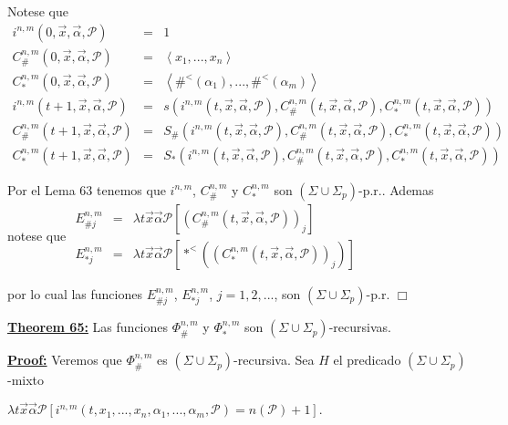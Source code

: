 Notese que
\(\displaystyle \begin{array}{rcl} i^{n,m}(0,\vec{x},\vec{\alpha},\mathcal{P}) & =& 1 \\ C_{\#}^{n,m}(0,\vec{x},\vec{\alpha},\mathcal{P}) & =& \left\langle x_{1},...,x_{n}\right\rangle \\ C_{\ast }^{n,m}(0,\vec{x},\vec{\alpha},\mathcal{P}) & =& \left\langle \#^{< }(\alpha _{1}),...,\#^{< }(\alpha _{m})\right\rangle \\ i^{n,m}(t+1,\vec{x},\vec{\alpha},\mathcal{P}) & =& s(i^{n,m}(t,\vec{x},\vec{ \alpha},\mathcal{P}),C_{\#}^{n,m}(t,\vec{x},\vec{\alpha},\mathcal{P} ),C_{\ast }^{n,m}(t,\vec{x},\vec{\alpha},\mathcal{P})) \\ C_{\#}^{n,m}(t+1,\vec{x},\vec{\alpha},\mathcal{P}) & =& S_{\#}(i^{n,m}(t,\vec{x },\vec{\alpha},\mathcal{P}),C_{\#}^{n,m}(t,\vec{x},\vec{\alpha},\mathcal{P} ),C_{\ast }^{n,m}(t,\vec{x},\vec{\alpha},\mathcal{P})) \\ C_{\ast }^{n,m}(t+1,\vec{x},\vec{\alpha},\mathcal{P}) & =& S_{\ast }(i^{n,m}(t, \vec{x},\vec{\alpha},\mathcal{P}),C_{\#}^{n,m}(t,\vec{x},\vec{\alpha}, \mathcal{P}),C_{\ast }^{n,m}(t,\vec{x},\vec{\alpha},\mathcal{P})) \end{array} \)

Por el Lema 63 tenemos que \(i^{n,m}\), \( C_{\#}^{n,m}\) y \(C_{\ast }^{n,m}\) son \((\Sigma \cup \Sigma _{p})\)-p.r.. Ademas notese que
\(\displaystyle \begin{array}{rcl} E_{\#j}^{n,m} & =& \lambda t\vec{x}\vec{\alpha}\mathcal{P}\left[ (C_{\#}^{n,m}(t,\vec{x},\vec{\alpha},\mathcal{P}))_{j}\right] \\ E_{\ast j}^{n,m} & =& \lambda t\vec{x}\vec{\alpha}\mathcal{P}\left[ \ast ^{< }((C_{\ast }^{n,m}(t,\vec{x},\vec{\alpha},\mathcal{P}))_{j})\right] \end{array} \)

por lo cual las funciones \(E_{\#j}^{n,m}\), \(E_{\ast j}^{n,m}\), \(j=1,2,...\), son \((\Sigma \cup \Sigma _{p})\)-p.r. \(\Box\)


\textbf{\underline{Theorem 65:}} Las funciones \(\Phi _{\#}^{n,m}\) y \(\Phi _{\ast }^{n,m}\) son \((\Sigma \cup \Sigma _{p})\)-recursivas.

\textbf{\underline{Proof:}} Veremos que \(\Phi _{\#}^{n,m}\) es \((\Sigma \cup \Sigma _{p})\)-recursiva. Sea \(H\) el predicado \((\Sigma \cup \Sigma _{p})\)-mixto

\(\displaystyle \lambda t\vec{x}\vec{\alpha}\mathcal{P}\left[ i^{n,m}(t,x_{1},...,x_{n}, \alpha _{1},...,\alpha _{m},\mathcal{P})=n(\mathcal{P})+1\right] \text{.} \)

